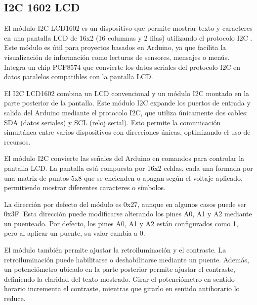 \documentclass[12pt,a4paper]{article}
\begin{document}
\subsection{I2C 1602 LCD}
El módulo I2C LCD1602 es un dispositivo que permite mostrar texto y caracteres en una pantalla LCD de 16x2 (16 columnas y 2 filas) utilizando el protocolo I2C \cite{lcd}. Este módulo es útil para proyectos basados en Arduino, ya que facilita la visualización de información como lecturas de sensores, mensajes o menús. Integra un chip PCF8574 que convierte los datos seriales del protocolo I2C en datos paralelos compatibles con la pantalla LCD.

El I2C LCD1602 combina un LCD convencional y un módulo I2C montado en la parte posterior de la pantalla. Este módulo I2C expande los puertos de entrada y salida del Arduino mediante el protocolo I2C, que utiliza únicamente dos cables: SDA (datos seriales) y SCL (reloj serial). Esto permite la comunicación simultánea entre varios dispositivos con direcciones únicas, optimizando el uso de recursos.

El módulo I2C convierte las señales del Arduino en comandos para controlar la pantalla LCD. La pantalla está compuesta por 16x2 celdas, cada una formada por una matriz de puntos 5x8 que se encienden o apagan según el voltaje aplicado, permitiendo mostrar diferentes caracteres o símbolos.

La dirección por defecto del módulo es 0x27, aunque en algunos casos puede ser 0x3F. Esta dirección puede modificarse alterando los pines A0, A1 y A2 mediante un puenteado. Por defecto, los pines A0, A1 y A2 están configurados como 1, pero al aplicar un puente, su valor cambia a 0.

El módulo también permite ajustar la retroiluminación y el contraste. La retroiluminación puede habilitarse o deshabilitarse mediante un puente. Además, un potenciómetro ubicado en la parte posterior permite ajustar el contraste, definiendo la claridad del texto mostrado. Girar el potenciómetro en sentido horario incrementa el contraste, mientras que girarlo en sentido antihorario lo reduce.
\end{document}
